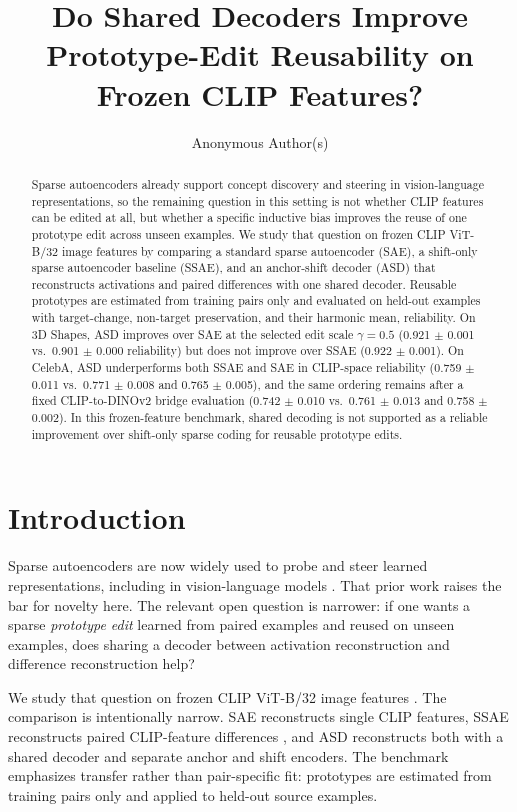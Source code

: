 \documentclass{article}
\title{Do Shared Decoders Improve Prototype-Edit Reusability on Frozen CLIP Features?}
\author{Anonymous Author(s)}
\begin{document}
\maketitle

\begin{abstract}
Sparse autoencoders already support concept discovery and steering in vision-language representations, so the remaining question in this setting is not whether CLIP features can be edited at all, but whether a specific inductive bias improves the reuse of one prototype edit across unseen examples. We study that question on frozen CLIP ViT-B/32 image features by comparing a standard sparse autoencoder (SAE), a shift-only sparse autoencoder baseline (SSAE), and an anchor-shift decoder (ASD) that reconstructs activations and paired differences with one shared decoder. Reusable prototypes are estimated from training pairs only and evaluated on held-out examples with target-change, non-target preservation, and their harmonic mean, reliability. On 3D Shapes, ASD improves over SAE at the selected edit scale $\gamma=0.5$ (0.921 $\pm$ 0.001 vs.\ 0.901 $\pm$ 0.000 reliability) but does not improve over SSAE (0.922 $\pm$ 0.001). On CelebA, ASD underperforms both SSAE and SAE in CLIP-space reliability (0.759 $\pm$ 0.011 vs.\ 0.771 $\pm$ 0.008 and 0.765 $\pm$ 0.005), and the same ordering remains after a fixed CLIP-to-DINOv2 bridge evaluation (0.742 $\pm$ 0.010 vs.\ 0.761 $\pm$ 0.013 and 0.758 $\pm$ 0.002). In this frozen-feature benchmark, shared decoding is not supported as a reliable improvement over shift-only sparse coding for reusable prototype edits.
\end{abstract}

\section{Introduction}

Sparse autoencoders are now widely used to probe and steer learned representations, including in vision-language models \citep{pach2025monosemantic, joseph2025steeringclip, gu2026lucid}. That prior work raises the bar for novelty here. The relevant open question is narrower: if one wants a sparse \emph{prototype edit} learned from paired examples and reused on unseen examples, does sharing a decoder between activation reconstruction and difference reconstruction help?

We study that question on frozen CLIP ViT-B/32 image features \citep{radford2021clip}. The comparison is intentionally narrow. SAE reconstructs single CLIP features, SSAE reconstructs paired CLIP-feature differences \citep{joshi2025ssae}, and ASD reconstructs both with a shared decoder and separate anchor and shift encoders. The benchmark emphasizes transfer rather than pair-specific fit: prototypes are estimated from training pairs only and applied to held-out source examples.
\end{document}
